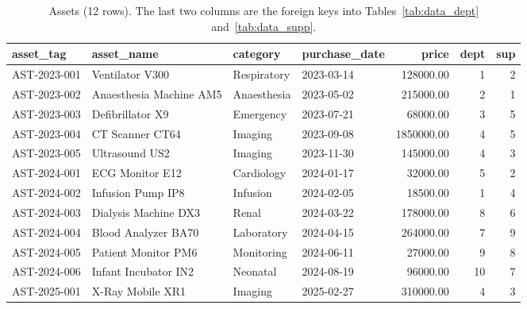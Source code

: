 \documentclass[conference]{IEEEtran}
\begin{document}
\begin{table}[!t]
\caption{Assets (12 rows). The last two columns are the foreign keys into Tables~\ref{tab:data_dept} and~\ref{tab:data_supp}.}
\label{tab:data_asset}
\centering
\small
\begin{tabular}{llllrrr}
\toprule
asset\_tag & asset\_name & category & purchase\_date & price & dept & sup \\
\midrule
AST-2023-001 & Ventilator V300 & Respiratory & 2023-03-14 & 128000.00 & 1 & 2 \\
AST-2023-002 & Anaesthesia Machine AM5 & Anaesthesia & 2023-05-02 & 215000.00 & 2 & 1 \\
AST-2023-003 & Defibrillator X9 & Emergency & 2023-07-21 & 68000.00 & 3 & 5 \\
AST-2023-004 & CT Scanner CT64 & Imaging & 2023-09-08 & 1850000.00 & 4 & 5 \\
AST-2023-005 & Ultrasound US2 & Imaging & 2023-11-30 & 145000.00 & 4 & 3 \\
AST-2024-001 & ECG Monitor E12 & Cardiology & 2024-01-17 & 32000.00 & 5 & 2 \\
AST-2024-002 & Infusion Pump IP8 & Infusion & 2024-02-05 & 18500.00 & 1 & 4 \\
AST-2024-003 & Dialysis Machine DX3 & Renal & 2024-03-22 & 178000.00 & 8 & 6 \\
AST-2024-004 & Blood Analyzer BA70 & Laboratory & 2024-04-15 & 264000.00 & 7 & 9 \\
AST-2024-005 & Patient Monitor PM6 & Monitoring & 2024-06-11 & 27000.00 & 9 & 8 \\
AST-2024-006 & Infant Incubator IN2 & Neonatal & 2024-08-19 & 96000.00 & 10 & 7 \\
AST-2025-001 & X-Ray Mobile XR1 & Imaging & 2025-02-27 & 310000.00 & 4 & 3 \\
\bottomrule
\end{tabular}
\end{table}
\end{document}
